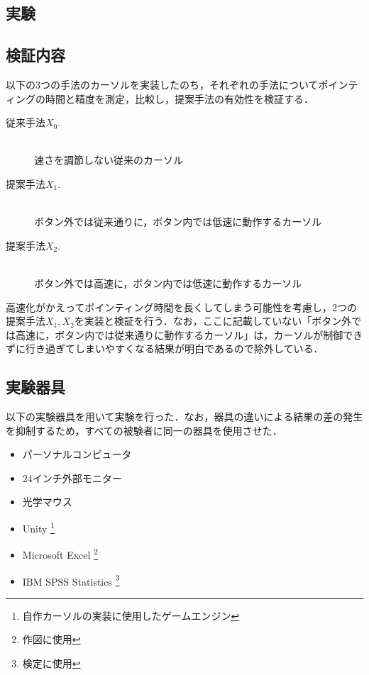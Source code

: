 \documentclass[a4paper, papersize, titlepage]{jsarticle}
\begin{document}
\begin{multicols}{2}
\section{実験}

\subsection{検証内容}
以下の3つの手法のカーソルを実装したのち，それぞれの手法についてポインティングの時間と精度を測定，比較し，提案手法の有効性を検証する．
\begin{description}
\item[従来手法$X_0$.] ~\\ 速さを調節しない従来のカーソル
\item[提案手法$X_1$.] ~\\ ボタン外では従来通りに，ボタン内では低速に動作するカーソル
\item[提案手法$X_2$.] ~\\ ボタン外では高速に，ボタン内では低速に動作するカーソル
\end{description}

高速化がかえってポインティング時間を長くしてしまう可能性を考慮し，2つの提案手法$X_1, X_2$を実装と検証を行う．なお，ここに記載していない「ボタン外では高速に，ボタン内では従来通りに動作するカーソル」は，カーソルが制御できずに行き過ぎてしまいやすくなる結果が明白であるので除外している．


\subsection{実験器具}

以下の実験器具を用いて実験を行った．なお，器具の違いによる結果の差の発生を抑制するため，すべての被験者に同一の器具を使用させた．

\begin{itemize}
\item パーソナルコンピュータ
\item 24インチ外部モニター
\item 光学マウス
\item Unity \footnote{自作カーソルの実装に使用したゲームエンジン}
\item Microsoft Excel \footnote{作図に使用}
\item IBM SPSS Statistics \footnote{検定に使用}
\end{itemize}



\end{multicols}
\end{document}
